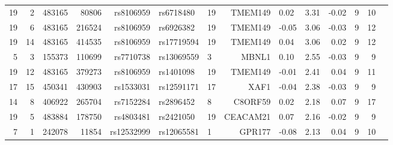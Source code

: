 \documentclass[paper=a4, fontsize=11pt]{scrartcl}	%
\numberwithin{equation}{section}									%
\numberwithin{figure}{section}										%
\numberwithin{table}{section}										%
\begin{document}
\begin{table}
{\begin{tabular}{rrrrrllrlrrrrr}
19 &   2 & 483165 & 80806 & rs8106959 & rs6718480 &  19 & TMEM149 & 0.02 & 3.31 & -0.02 &   9 &  10 \\ 
19 &   6 & 483165 & 216524 & rs8106959 & rs6926382 &  19 & TMEM149 & -0.05 & 3.06 & -0.03 &   9 &  12 \\ 
19 &  14 & 483165 & 414535 & rs8106959 & rs17719594 &  19 & TMEM149 & 0.04 & 3.06 & 0.02 &   9 &  12 \\ 
5 &   3 & 155373 & 110699 & rs7710738 & rs13069559 &   3 & MBNL1 & 0.10 & 2.55 & -0.03 &   9 &   9 \\ 
19 &  12 & 483165 & 379273 & rs8106959 & rs1401098 &  19 & TMEM149 & -0.01 & 2.41 & 0.04 &   9 &  11 \\ 
17 &  15 & 450341 & 430903 & rs1533031 & rs12591171 &  17 & XAF1 & -0.04 & 2.38 & -0.03 &   9 &   9 \\ 
14 &   8 & 406922 & 265704 & rs7152284 & rs2896452 &   8 & C8ORF59 & 0.02 & 2.18 & 0.07 &   9 &  17 \\ 
19 &   5 & 483884 & 178750 & rs4803481 & rs2421050 &  19 & CEACAM21 & 0.07 & 2.16 & -0.02 &   9 &   9 \\ 
7 &   1 & 242078 & 11854 & rs12532999 & rs12065581 &   1 & GPR177 & -0.08 & 2.13 & 0.04 &   9 &  10 \\ 
   \hline
\end{tabular}
}
\end{table}
\end{document}
